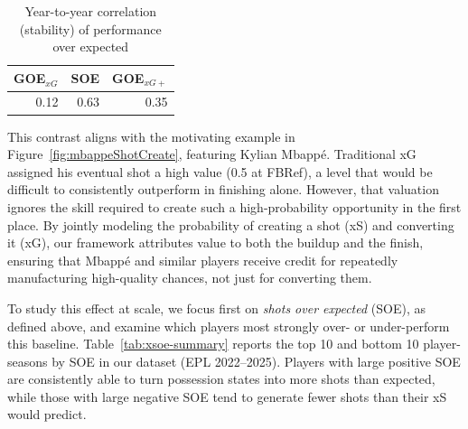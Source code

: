 \documentclass[12pt,letterpaper]{article}
\begin{document}
\begin{table}[!h]
\centering
\caption{Year-to-year correlation (stability) of performance over expected}
\label{tab:metricStability}
\begin{tabular}[t]{rrr}
\toprule
\textbf{GOE\(_{xG}\)} & \textbf{SOE} & \textbf{GOE\(_{xG+}\)} \\
\midrule
0.12 & 0.63 & 0.35 \\
\bottomrule
\end{tabular}
\end{table}

This contrast aligns with the motivating example in Figure~\ref{fig:mbappeShotCreate}, featuring Kylian Mbappé. Traditional xG assigned his eventual shot a high value (0.5 at FBRef), a level that would be difficult to consistently outperform in finishing alone. However, that valuation ignores the skill required to create such a high-probability opportunity in the first place. By jointly modeling the probability of creating a shot (xS) and converting it (xG), our framework attributes value to both the buildup and the finish, ensuring that Mbappé and similar players receive credit for repeatedly manufacturing high-quality chances, not just for converting them.

To study this effect at scale, we focus first on \emph{shots over expected} (SOE), as defined above, and examine which players most strongly over- or under-perform this baseline. Table~\ref{tab:xsoe-summary} reports the top 10 and bottom 10 player-seasons by SOE in our dataset (EPL 2022--2025). Players with large positive SOE are consistently able to turn possession states into more shots than expected, while those with large negative SOE tend to generate fewer shots than their xS would predict.
\end{document}

